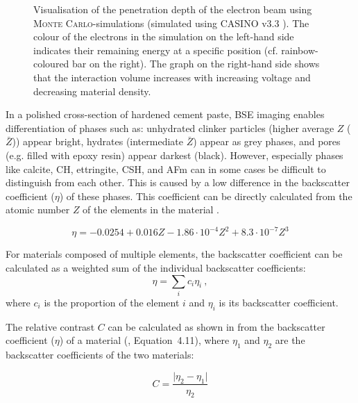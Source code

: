 \begin{figure}[!htb]
\begin{subfigure}[t]{0.48\textwidth}
	\end{subfigure}

	\caption{
		Visualisation of the penetration depth of the electron beam using \textsc{Monte Carlo}-simulations (simulated using \textsc{CASINO} v3.3 \cite{drouin.2016}).
		The colour of the electrons in the simulation on the left-hand side indicates their remaining energy at a specific position (cf. rainbow-coloured bar on the right).
		The graph on the right-hand side shows that the interaction volume increases with increasing voltage and decreasing material density.
	}
	\label{fig:penetration_depth}
\end{figure}

In a polished cross-section of hardened cement paste, \ac{BSE} imaging enables differentiation of phases such as: unhydrated clinker particles (higher average $Z$ ($\bar{Z}$)) appear bright, hydrates (intermediate $\bar{Z}$) appear as grey phases, and pores (e.g. filled with epoxy resin) appear darkest (black).
However, especially phases like calcite, \ac{CH}, ettringite, \ac{CSH}, and \ac{AFm} can in some cases be difficult to distinguish from each other.
This is caused by a low difference in the backscatter coefficient ($\eta$) of these phases.
This coefficient can be directly calculated from the atomic number $Z$ of the elements in the material \cite{reuter.1972,goldstein.1992a}.

\begin{equation}
    \label{eq:bse_eta}
    \eta = -0.0254 + 0.016Z - 1.86 \cdot 10^{-4}Z^2 + 8.3 \cdot 10^{-7}Z^3
\end{equation}

For materials composed of multiple elements, the backscatter coefficient can be calculated as a weighted sum of the individual backscatter coefficients:
\begin{equation}
    \eta = \sum_{i} c_i \eta_i ~, 
\end{equation}
where $c_i$ is the proportion of the element $i$ and $\eta_i$ is its backscatter coefficient.

The relative contrast $C$ can be calculated as shown in  from the backscatter coefficient ($\eta$) of a material (\cite{goldstein.1992}, Equation~4.11), where $\eta_1$ and $\eta_2$ are the backscatter coefficients of the two materials:

\begin{equation}
    C = \frac{\lvert \eta_2 - \eta_1 \rvert}{\eta_2}
    \label{eq:bse_contrast}
\end{equation}

